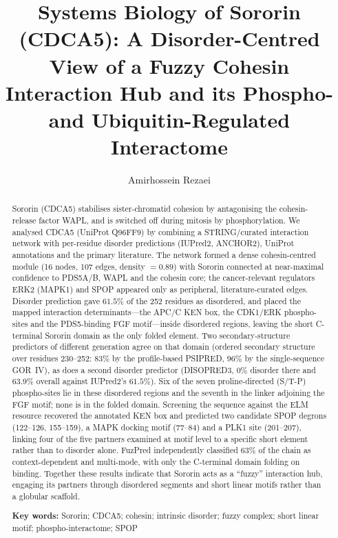 \documentclass[11pt]{article}
\title{\vspace{-1.2cm}\bfseries Systems Biology of Sororin (CDCA5): A Disorder-Centred View of a Fuzzy Cohesin Interaction Hub and its Phospho- and Ubiquitin-Regulated Interactome}
\author[ ]{Amirhossein Rezaei}
\affil[ ]{\normalsize\itshape Physics of Data, Department of Physics and Astronomy ``Galileo Galilei'', University of Padova, I-35131 Padova, Italy\\ \texttt{amirhossein.rezaeigolmarz@studenti.unipd.it}}
\date{}
\begin{document}
\maketitle
\vspace{-0.9cm}

\begin{abstract}
\noindent Sororin (CDCA5) stabilises sister-chromatid cohesion by antagonising the cohesin-release factor WAPL, and is switched off during mitosis by phosphorylation. We analysed CDCA5 (UniProt Q96FF9) by combining a STRING/curated interaction network with per-residue disorder predictions (IUPred2, ANCHOR2), UniProt annotations and the primary literature. The network formed a dense cohesin-centred module (16 nodes, 107 edges, density $=0.89$) with Sororin connected at near-maximal confidence to PDS5A/B, WAPL and the cohesin core; the cancer-relevant regulators ERK2 (MAPK1) and SPOP appeared only as peripheral, literature-curated edges. Disorder prediction gave $61.5\%$ of the 252 residues as disordered, and placed the mapped interaction determinants---the APC/C KEN box, the CDK1/ERK phospho-sites and the PDS5-binding FGF motif---inside disordered regions, leaving the short C-terminal Sororin domain as the only folded element. Two secondary-structure predictors of different generation agree on that domain (ordered secondary structure over residues 230--252: $83\%$ by the profile-based PSIPRED, $96\%$ by the single-sequence GOR~IV), as does a second disorder predictor (DISOPRED3, $0\%$ disorder there and $63.9\%$ overall against IUPred2's $61.5\%$). Six of the seven proline-directed (S/T-P) phospho-sites lie in these disordered regions and the seventh in the linker adjoining the FGF motif; none is in the folded domain. Screening the sequence against the ELM resource recovered the annotated KEN box and predicted two candidate SPOP degrons (122--126, 155--159), a MAPK docking motif (77--84) and a PLK1 site (201--207), linking four of the five partners examined at motif level to a specific short element rather than to disorder alone. FuzPred independently classified $63\%$ of the chain as context-dependent and multi-mode, with only the C-terminal domain folding on binding. Together these results indicate that Sororin acts as a ``fuzzy'' interaction hub, engaging its partners through disordered segments and short linear motifs rather than a globular scaffold.

\vspace{0.4em}
\noindent\textbf{Key words:} Sororin; CDCA5; cohesin; intrinsic disorder; fuzzy complex; short linear motif; phospho-interactome; SPOP
\end{abstract}
\end{document}
